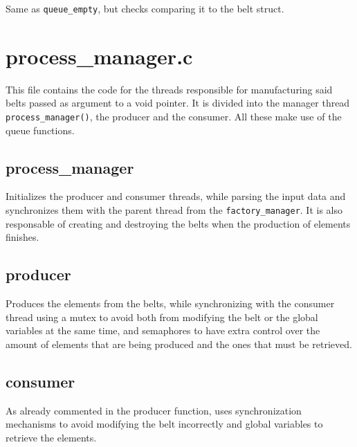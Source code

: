 \documentclass[es]{uc3mreport}
\begin{document}
\begin{report}
      \setcounter{subsubsection}{0}

      Same as \texttt{queue\_empty}, but checks comparing it to the belt
      struct.

      \section{process\_manager.c}

      \setcounter{subsection}{0}

      \setcounter{subsubsection}{0}

      This file contains the code for the threads responsible for
      manufacturing said belts passed as argument to a void pointer. It
      is divided into the manager thread \texttt{process\_manager()},
      the producer and the consumer. All these make use of the queue
      functions.

      \subsection{process\_manager}

      \setcounter{subsubsection}{0}

      Initializes the producer and consumer threads, while parsing the
      input data and synchronizes them with the parent thread from the
      \texttt{factory\_manager}. It is also responsable of creating and
      destroying the belts when the production of elements finishes.

      \subsection{producer}

      \setcounter{subsubsection}{0}

      Produces the elements from the belts, while synchronizing with the
      consumer thread using a mutex to avoid both from modifying the
      belt or the global variables at the same time, and semaphores to
      have extra control over the amount of elements that are being
      produced and the ones that must be retrieved.

      \subsection{consumer}

      \setcounter{subsubsection}{0}

      As already commented in the producer function, uses
      synchronization mechanisms to avoid modifying the belt incorrectly
      and global variables to retrieve the elements.


\end{report}
\end{document}

